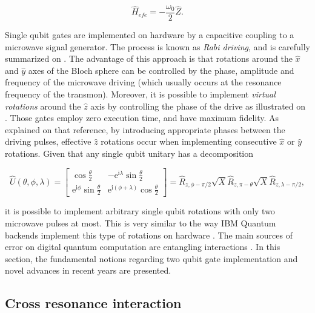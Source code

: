     \begin{equation}
      \hat{H}_{efe} = -\frac{\omega_0}{2} \hat{Z}.
      \label{eq:qubitHamiltonian}
    \end{equation}

    Single qubit gates are implemented on hardware by a capacitive coupling to a microwave signal generator. The process is known as \textit{Rabi driving}, and is carefully summarized on \cite{quantumEngineer}. The advantage of this approach is that rotations around the $\hat{x}$ and $\hat{y}$ axes of the Bloch sphere can be controlled by the phase, amplitude and frequency of the microwave driving (which usually occurs at the resonance frequency of the transmon). Moreover, it is possible to implement \textit{virtual rotations} around the $\hat{z}$ axis by controlling the phase of the drive as illustrated on \cite{quantumEngineer}. Those gates employ zero execution time, and have maximum fidelity. As explained on that reference, by introducing appropriate phases between the driving pulses, effective $\hat{z}$ rotations occur when implementing consecutive $\hat{x}$ or $\hat{y}$ rotations. Given that any single qubit unitary has a decomposition

    \begin{equation}
      \hat{U}(\theta, \phi, \lambda) = \begin{bmatrix}
        \cos{\frac{\theta}{2}} & -\mathrm{e}^{\mathrm{i}\lambda}\sin{\frac{\theta}{2}} \\
        \mathrm{e}^{\mathrm{i}\phi}\sin{\frac{\theta}{2}} & \mathrm{e}^{\mathrm{i}(\phi+\lambda)}\cos{\frac{\theta}{2}}
      \end{bmatrix}= \hat{R}_{z, \phi-\pi/2} \sqrt{X} \hat{R}_{z, \pi-\theta} \sqrt{X} \hat{R}_{z, \lambda-\pi/2}, 
      \label{eq:qiskitGateImplement}
    \end{equation}

    \noindent it is possible to implement arbitrary single qubit rotations with only two microwave pulses at most. This is very similar to the way IBM Quantum backends implement this type of rotations on hardware \cite{Qiskit}. The main sources of error on digital quantum computation are entangling interactions \cite{HeisenbergSimulLasHeras}. In this section, the fundamental notions regarding two qubit gate implementation and novel advances in recent years are presented.

  \subsection{Cross resonance interaction}
  \label{subsec:CrossResonanceInteraction}

